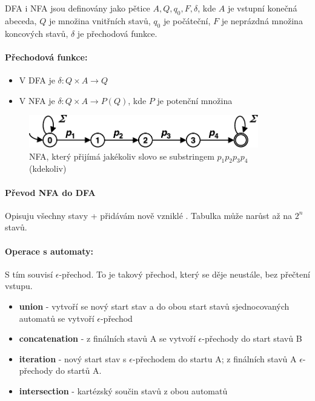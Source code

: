 DFA i NFA jsou definovány jako pětice ${A, Q, q_0, F, \delta}$, kde $A$ je vstupní konečná abeceda, $Q$ je množina vnitřních stavů, $q_0$ je počáteční, $F$ je neprázdná množina koncových stavů, $\delta$ je přechodová funkce.

\paragraph{Přechodová funkce:}
\begin{itemize}
\item V DFA je $\delta : Q \times A \rightarrow Q$
\item V NFA je $\delta : Q \times A \rightarrow P(Q)$, kde $P$ je potenční množina
\end{itemize}

\begin{figure}[h]
    \begin{center}
        \includegraphics[width=100mm]{04/images/automat-hledani}
    \end{center}
    \caption{NFA, který přijímá jakékoliv slovo se substringem $p_1p_2p_3p_4$ (kdekoliv)}
\end{figure}

\paragraph{Převod NFA do DFA} Opisuju všechny stavy + přidávám nově vzniklé . Tabulka může narůst až na $2^n$ stavů.

\paragraph{Operace s automaty:} S tím souvisí $\epsilon$-přechod. To je takový přechod, který se děje neustále, bez přečtení vstupu.
\begin{itemize}
\item \textbf{union} - vytvoří se nový start stav a do obou start stavů sjednocovaných automatů se vytvoří $\epsilon$-přechod
\item \textbf{concatenation} - z finálních stavů A se vytvoří $\epsilon$-přechody do start stavů B
\item \textbf{iteration} - nový start stav s $\epsilon$-přechodem do startu A; z finálních stavů A $\epsilon$-přechody do startů A.
\item \textbf{intersection} - kartézský součin stavů z obou automatů
\end{itemize}

